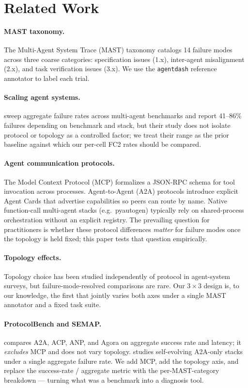 \section{Related Work}

\paragraph{MAST taxonomy.} The Multi-Agent System Trace (MAST) taxonomy
\cite{mast2024} catalogs 14 failure modes across three coarse categories:
specification issues (1.x), inter-agent misalignment (2.x), and task verification
issues (3.x). We use the \texttt{agentdash} reference annotator to label each trial.

\paragraph{Scaling agent systems.} \cite{scaling_agents_2025} sweep aggregate failure
rates across multi-agent benchmarks and report 41--86\% failures depending on
benchmark and stack, but their study does not isolate protocol or topology as a
controlled factor; we treat their range as the prior baseline against which our
per-cell FC2 rates should be compared.

\paragraph{Agent communication protocols.} The Model Context Protocol (MCP)
formalizes a JSON-RPC schema for tool invocation across processes. Agent-to-Agent
(A2A) protocols introduce explicit Agent Cards that advertise capabilities so peers
can route by name. Native function-call multi-agent stacks (e.g.\ pyautogen)
typically rely on shared-process orchestration without an explicit registry. The
prevailing question for practitioners is whether these protocol differences
\emph{matter} for failure modes once the topology is held fixed; this paper tests
that question empirically.

\paragraph{Topology effects.} Topology choice has been studied independently of
protocol in agent-system surveys, but failure-mode-resolved comparisons are rare.
Our $3 \times 3$ design is, to our knowledge, the first that jointly varies both
axes under a single MAST annotator and a fixed task suite.

\paragraph{ProtocolBench and SEMAP.} \cite{protocolbench2025} compares
A2A, ACP, ANP, and Agora on aggregate success rate and latency; it
\emph{excludes} MCP and does not vary topology. \cite{semap2025} studies
self-evolving A2A-only stacks under a single aggregate failure rate. We
add MCP, add the topology axis, and replace the success-rate / aggregate
metric with the per-MAST-category breakdown — turning what was a
benchmark into a diagnosis tool.
